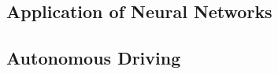 \documentclass{article}
\begin{document}
\begin{CJK}{UTF8}{gbsn}
\section{Application of Neural Networks}
\subsection{Autonomous Driving}
\end{CJK}
\end{document}
